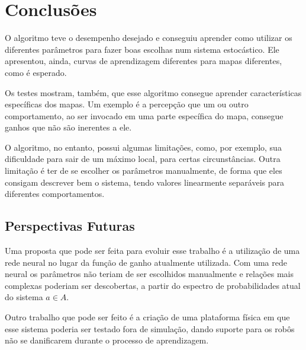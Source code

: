 

\chapter{Conclusões} \label{Chap:Conclusoes}

O algoritmo teve o desempenho desejado e conseguiu aprender como utilizar os diferentes parâmetros para fazer boas escolhas num sistema estocástico. Ele apresentou, ainda, curvas  de aprendizagem diferentes para mapas diferentes, como é esperado.

Os testes mostram, também, que esse algoritmo consegue aprender características específicas dos mapas. Um exemplo é a percepção que um ou outro comportamento, ao ser invocado em uma parte específica do mapa, consegue ganhos que não são inerentes a ele.

O algoritmo, no entanto, possui algumas limitações, como, por exemplo, sua dificuldade para sair de um máximo local, para certas circunstâncias. Outra limitação é ter de se escolher os parâmetros manualmente, de forma que eles consigam descrever bem o sistema, tendo valores linearmente separáveis para diferentes comportamentos.

\section{Perspectivas Futuras}

Uma proposta que pode ser feita para evoluir esse trabalho é a utilização de uma rede neural no lugar da função de ganho atualmente utilizada. Com uma rede neural os parâmetros não teriam de ser escolhidos manualmente e relações mais complexas poderiam ser descobertas, a partir do espectro de probabilidades atual do sistema $ a \in A $.

Outro trabalho que pode ser feito é a criação de uma plataforma física em que esse sistema poderia ser testado fora de simulação, dando suporte para os robôs não se danificarem durante o processo de aprendizagem.
